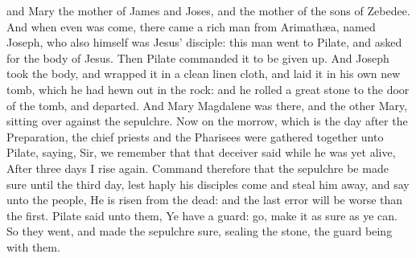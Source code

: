 and Mary the mother of James and Joses, and the mother of the sons of Zebedee.  And when even was come, there came a rich man from Arimathæa, named Joseph, who also himself was Jesus’ disciple: this man went to Pilate, and asked for the body of Jesus. Then Pilate commanded it to be given up. And Joseph took the body, and wrapped it in a clean linen cloth, and laid it in his own new tomb, which he had hewn out in the rock: and he rolled a great stone to the door of the tomb, and departed. And Mary Magdalene was there, and the other Mary, sitting over against the sepulchre.  Now on the morrow, which is the day after the Preparation, the chief priests and the Pharisees were gathered together unto Pilate, saying, Sir, we remember that that deceiver said while he was yet alive, After three days I rise again. Command therefore that the sepulchre be made sure until the third day, lest haply his disciples come and steal him away, and say unto the people, He is risen from the dead: and the last error will be worse than the first. Pilate said unto them, Ye have a guard: go, make it as sure as ye can. So they went, and made the sepulchre sure, sealing the stone, the guard being with them. 

